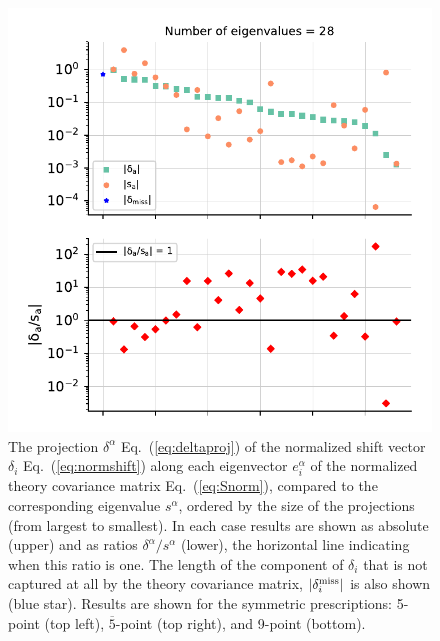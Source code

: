 \begin{figure}[ht!]
\begin{center}
    \includegraphics[scale=0.6]{mhous/plots/projector_eigenvalue_ratio_9pt_global.pdf}
    \caption{\small The projection $\delta^\alpha$ Eq.~(\ref{eq:deltaproj}) of the normalized shift vector
      $\delta_i$ Eq.~(\ref{eq:normshift}) along each eigenvector $e^\alpha_i$ of the normalized theory covariance
      matrix Eq.~(\ref{eq:Snorm}), compared to the corresponding eigenvalue 
    $s^\alpha$, ordered
      by the size of the projections (from largest to
      smallest). In each case results are shown as absolute (upper) and
      as ratios $\delta^\alpha/s^\alpha$ (lower), the horizontal line indicating when this ratio is one.  The length of the 
        component of 
       $\delta_i$ that is not captured at all by the theory covariance 
    matrix, $|\delta^{\rm miss}_i|$ is also shown (blue star).
      Results are shown for the symmetric prescriptions: 5-point (top left),
    $\overline{5}$-point (top right), and 9-point (bottom).}
    \label{fig:evals_all_prescriptions_symmetric}
  \end{center}
\end{figure}



